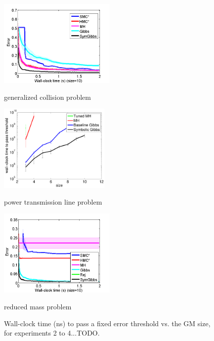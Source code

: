 \documentclass{article}
\begin{document}
\begin{figure}
\label{fig:errVtimeSizeFixed}
\begin{center}
\begin{minipage}[b]{0.33\textwidth}
 \includegraphics[width=1\linewidth, height=120pt]{plots/collision/collisionErrVsTimeInSize10.png}
\caption{generalized collision problem}
\label{fig:err-threshold-vs-size-collision}
\end{minipage}
%
\begin{minipage}[b]{0.33\textwidth}
\includegraphics[width=1\linewidth, height=120pt]{Figs/plots/fermentation/time_vs_param-errorbar.pdf}
\caption{power transmission line problem}
\label{fig:err-threshold-vs-size-alc}
\end{minipage}
\begin{minipage}[b]{0.33\textwidth}
\includegraphics[width=1\linewidth, height=120pt]{plots/conductance/con_err_vs_time_size10.png}
\caption{reduced mass problem}
\label{fig:err-threshold-vs-size-circuit}
\end{minipage}
\end{center}
\caption{Wall-clock time (ns) to pass a fixed error threshold vs. the GM size, for experiments 2 to 4...TODO.}
\end{figure}
\end{document}
